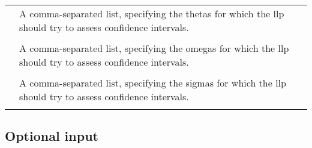 \documentclass[a4paper,12pt]{article}
\begin{document}
\begin{longtable}{p{1in}p{4in}}
\verb%-thetas=<theta number list>% & \\
\nopagebreak
 & A comma-separated list, specifying the thetas for which the llp should try to assess confidence intervals. \\
\\
\verb%-omegas= <omega number list>% & \\
 & A comma-separated list, specifying the omegas for which the llp should try to assess confidence intervals. \\
\\
\verb%-sigmas=<sigma number list>% & \\
 & A comma-separated list, specifying the sigmas for which the llp should try to assess confidence intervals. \\
\\
\end{longtable}

\subsection{Optional input}
\end{document}
